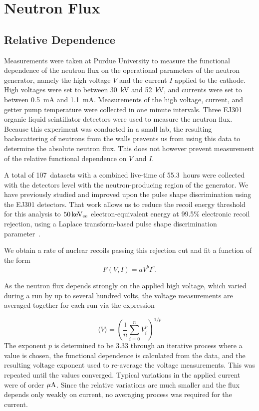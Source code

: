 \section{Neutron Flux}\label{sec:flux}

\subsection{Relative Dependence}\label{sec:relativeflux}

Measurements were taken at Purdue University to measure the functional dependence of the neutron flux on the operational parameters of the neutron generator, namely the high voltage $V$ and the current $I$ applied to the cathode. High voltages were set to between \SI{30}{kV} and \SI{52}{kV}, and currents were set to between \SI{0.5}{mA} and \SI{1.1}{mA}. Measurements of the high voltage, current, and getter pump temperature were collected in one minute intervals. Three EJ301 organic liquid scintillator detectors were used to measure the neutron flux. Because this experiment was conducted in a small lab, the resulting backscattering of neutrons from the walls prevents us from using this data to determine the absolute neutron flux. This does not however prevent measurement of the relative functional dependence on $V$ and $I$.

A total of 107~datasets with a combined live-time of 55.3~hours were collected with the detectors level with the neutron-producing region of the generator. We have previously studied and improved upon the pulse shape discrimination using the EJ301 detectors. That work allows us to reduce the recoil energy threshold for this analysis to $50\, \mathrm{keV_{ee}}$ electron-equivalent energy at 99.5\% electronic recoil rejection, using a Laplace transform-based pulse shape discrimination parameter~\cite{lang2016}.

We obtain a rate of nuclear recoils passing this rejection cut and fit a function of the form
\begin{equation} \label{eq:rate}
F(V,I) = aV^b I^c.
\end{equation}

As the neutron flux depends strongly on the applied high voltage, which varied during a run by up to several hundred volts, the voltage measurements are averaged together for each run via the expression

\begin{equation}
\langle V \rangle = \left(\frac{1}{n}\sum\limits_{i=0}^n V_i^p \right)^{1/p}
\end{equation}
The exponent $p$ is determined to be 3.33 through an iterative process where a value is chosen, the functional dependence is calculated from the data, and the resulting voltage exponent used to re-average the voltage measurements. This was repeated until the values converged. Typical variations in the applied current were of order $\mathrm{\mu A}$. Since the relative variations are much smaller and the flux depends only weakly on current, no averaging process was required for the current.


